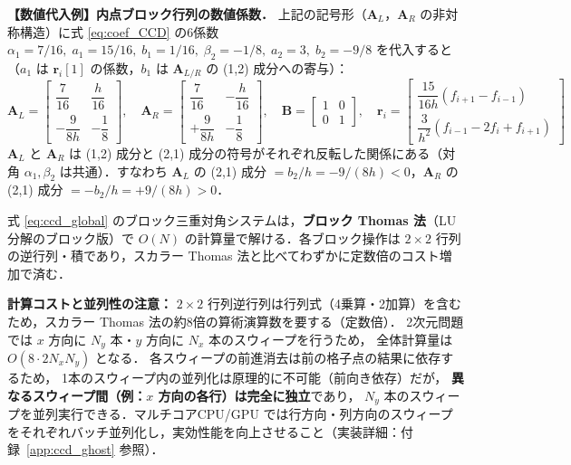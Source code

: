 \noindent\label{defbox:ccd_numeric_blocks}%
\textbf{【数値代入例】内点ブロック行列の数値係数．}
上記の記号形（$\mathbf{A}_L$，$\mathbf{A}_R$ の非対称構造）に式 \eqref{eq:coef_CCD} の6係数 $\alpha_1=7/16,\;a_1=15/16,\;b_1=1/16,\;\beta_2=-1/8,\;a_2=3,\;b_2=-9/8$ を代入すると
（$a_1$ は $\mathbf{r}_i[1]$ の係数，$b_1$ は $\mathbf{A}_{L/R}$ の (1,2) 成分への寄与）：
\[
  \mathbf{A}_L =
  \begin{bmatrix}
    \dfrac{7}{16} & \dfrac{h}{16} \\[8pt]
    -\dfrac{9}{8h} & -\dfrac{1}{8}
  \end{bmatrix},
  \quad
  \mathbf{A}_R =
  \begin{bmatrix}
    \dfrac{7}{16} & -\dfrac{h}{16} \\[8pt]
    +\dfrac{9}{8h} & -\dfrac{1}{8}
  \end{bmatrix},
  \quad
  \mathbf{B} =
  \begin{bmatrix}
    1 & 0 \\
    0 & 1
  \end{bmatrix},
  \quad
  \mathbf{r}_i =
  \begin{bmatrix}
    \dfrac{15}{16h}(f_{i+1}-f_{i-1}) \\[8pt]
    \dfrac{3}{h^2}(f_{i-1}-2f_i+f_{i+1})
  \end{bmatrix}
\]
$\mathbf{A}_L$ と $\mathbf{A}_R$ は (1,2) 成分と (2,1) 成分の符号がそれぞれ反転した関係にある（対角 $\alpha_1,\beta_2$ は共通）．すなわち $\mathbf{A}_L$ の (2,1) 成分 $= b_2/h = -9/(8h) < 0$，$\mathbf{A}_R$ の (2,1) 成分 $= -b_2/h = +9/(8h) > 0$．

\medskip

\noindent 式 \eqref{eq:ccd_global} のブロック三重対角システムは，\textbf{ブロック Thomas 法}（LU 分解のブロック版）で $O(N)$ の計算量で解ける．各ブロック操作は $2\times2$ 行列の逆行列・積であり，スカラー Thomas 法と比べてわずかに定数倍のコスト増加で済む．

\noindent\textbf{計算コストと並列性の注意：}
$2\times2$ 行列逆行列は行列式（4乗算・2加算）を含むため，スカラー Thomas 法の約8倍の算術演算数を要する（定数倍）．
2次元問題では $x$ 方向に $N_y$ 本・$y$ 方向に $N_x$ 本のスウィープを行うため，
全体計算量は $O(8 \cdot 2N_xN_y)$ となる．
各スウィープの前進消去は前の格子点の結果に依存するため，
1本のスウィープ内の並列化は原理的に不可能（前向き依存）だが，
\textbf{異なるスウィープ間（例：$x$ 方向の各行）は完全に独立}であり，
$N_y$ 本のスウィープを並列実行できる．マルチコアCPU/GPU では行方向・列方向のスウィープをそれぞれバッチ並列化し，実効性能を向上させること（実装詳細：付録~\ref{app:ccd_ghost} 参照）．

